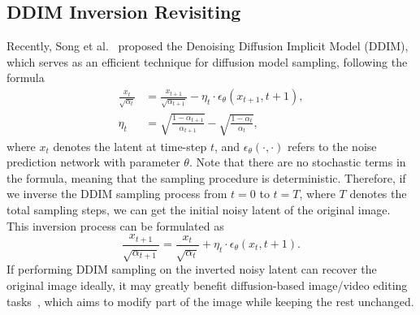 \documentclass{article}
\begin{document}
\subsection{DDIM Inversion Revisiting}
\label{sec: review DDIM}
Recently, Song et al.~\cite{song2021denoising} proposed the Denoising Diffusion Implicit Model (DDIM), which serves as an efficient technique for diffusion model sampling, following the formula
\begin{align}
    \frac{x_{t}}{\sqrt{\alpha_{t}}}&=\frac{x_{t+1}}{\sqrt{\alpha_{t+1}}}-\eta_t \cdot \epsilon_{\theta}\left(x_{t+1}, t+1\right), \nonumber \\
    \eta_t &= \sqrt{\frac{1-\alpha_{t+1}}{\alpha_{t+1}}} - \sqrt{\frac{1-\alpha_{t}}{\alpha_{t}}},
\label{eq: DDIM sampling}
\end{align}
where $x_{t}$ denotes the latent at time-step $t$, and $\epsilon_{\theta}\left(\cdot, \cdot\right)$ refers to the noise prediction network with parameter $\theta$.
Note that there are no stochastic terms in the formula, meaning that the sampling procedure is deterministic. 
Therefore, if we inverse the DDIM sampling process from $t=0$ to $t=T$, where $T$ denotes the total sampling steps, we can get the initial noisy latent of the original image. This inversion process can be formulated as
\begin{equation}
    \frac{x_{t+1}}{\sqrt{\alpha_{t+1}}}=\frac{x_t}{\sqrt{\alpha_t}} + \eta_t \cdot \epsilon_\theta\left(x_t, t+1\right).
\label{eq: DDIM inversion}
\end{equation}
If performing DDIM sampling on the inverted noisy latent can recover the original image ideally, it may greatly benefit diffusion-based image/video editing tasks~\cite{garibi2024renoise, ju2024pnp}, which aims to modify part of the image while keeping the rest unchanged.
\end{document}
